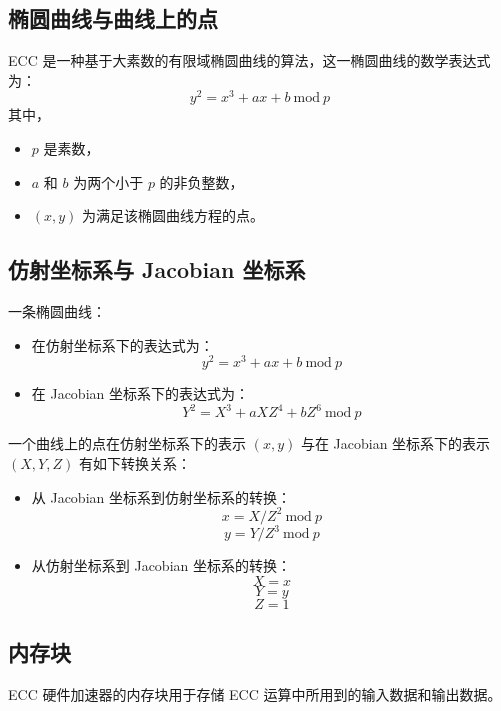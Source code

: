 \documentclass[main\_\_CN.tex]{subfiles}
\begin{document}
\subsection{椭圆曲线与曲线上的点}

ECC 是一种基于大素数的有限域椭圆曲线的算法，这一椭圆曲线的数学表达式为：
\[
{y}^{2} = {x}^{3} + {ax} + b \ \textrm{mod}\ p
\]
其中，
\begin{itemize}
    \item $p$ 是素数，
    \item $a$ 和 $b$ 为两个小于 $p$ 的非负整数，
    \item $(x, y)$ 为满足该椭圆曲线方程的点。
\end{itemize}

\subsection{仿射坐标系与 Jacobian 坐标系}

一条椭圆曲线：
\begin{itemize}
    \item 在仿射坐标系下的表达式为：
    \[
    {y}^{2} = {x}^{3} + {ax} + b \ \textrm{mod}\ p
    \]
    \item 在 Jacobian 坐标系下的表达式为：
    \[
    {Y}^{2} = {X}^{3} + {aXZ}^{4} + {bZ}^{6} \ \textrm{mod}\ p
    \]
\end{itemize}

一个曲线上的点在仿射坐标系下的表示 $(x, y)$ 与在 Jacobian 坐标系下的表示 $(X, Y, Z)$ 有如下转换关系：

\begin{itemize}
    \item 从 Jacobian 坐标系到仿射坐标系的转换：
    \[
    x = X / {Z}^2 \ \textrm{mod}\ p
    \]
    \[
    y = Y / {Z}^3 \ \textrm{mod}\ p
    \]
    \item 从仿射坐标系到 Jacobian 坐标系的转换：
    \[ X = x \]
    \[ Y = y \]
    \[ Z = 1\]
\end{itemize}

\subsection{内存块}

ECC 硬件加速器的内存块用于存储 ECC 运算中所用到的输入数据和输出数据。
\end{document}
